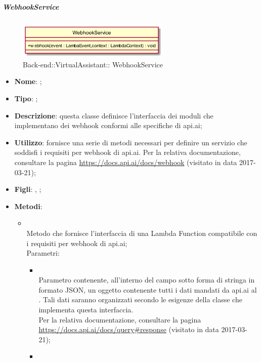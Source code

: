 \hypertarget{ WebhookService_label}{\subparagraph{ WebhookService}}
\begin{figure}[h]
	\centering
	\includegraphics[width=0.65\textwidth,height=\textheight,keepaspectratio]{images/ClassWebhookService.png}
	\caption{Back-end::VirtualAssistant:: WebhookService}
\end{figure}
\begin{itemize}
	\item \textbf{Nome}: ;
	\item \textbf{Tipo}: ;
	\item \textbf{Descrizione}: questa classe definisce l'interfaccia dei moduli che implementano dei webhook conformi alle specifiche di api.ai;
	\item \textbf{Utilizzo}: fornisce una serie di metodi necessari per definire un servizio che soddisfi i requisiti per webhook di api.ai.
Per la relativa documentazione, consultare la pagina \url{https://docs.api.ai/docs/webhook} (visitato in data 2017-03-21);
	\item \textbf{Figli}: , ;
	\item \textbf{Metodi}:
	\begin{itemize}
		\item[]  \\		Metodo che fornisce l'interfaccia di una Lambda Function compatibile con i requisiti per webhook di api.ai;\\
		Parametri:
		\begin{itemize}
			\item {} \\
			Parametro contenente, all'interno del campo  sotto forma di stringa in formato JSON, un oggetto contenente tutti i dati mandati da api.ai al . Tali dati saranno organizzati secondo le esigenze della classe che implementa questa interfaccia.\\
Per la relativa documentazione, consultare la pagina \url{https://docs.api.ai/docs/query#response}  (visitato in data 2017-03-21);
			\item {} \\

\end{itemize}
\end{itemize}
\end{itemize}
